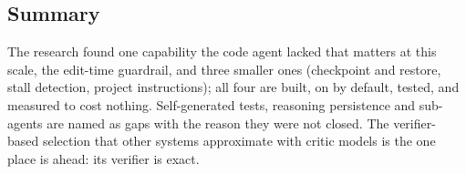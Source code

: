 \subsection{Summary}

The research found one capability the code agent lacked that matters at this scale, the edit-time guardrail, and three smaller ones
(checkpoint and restore, stall detection, project instructions); all four are built, on by default, tested, and measured to cost nothing.
Self-generated tests, reasoning persistence and sub-agents are named as gaps with the reason they were not closed. The verifier-based
selection that other systems approximate with critic models is the one place \Sys{} is ahead: its verifier is exact.

